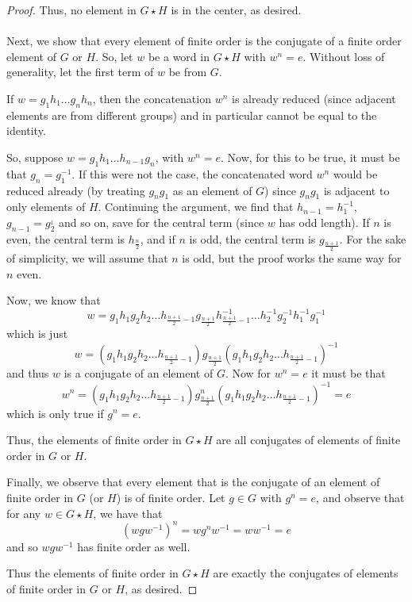 \documentclass[fontsize=11pt]{scrartcl} %
\numberwithin{equation}{section} %
\numberwithin{figure}{section} %
\numberwithin{table}{section} %
\begin{document}
\begin{proof}
    Thus, no element in $G\star H$ is in the center, as desired.
    \\
    \\
    Next, we show that every element of finite order is the conjugate of a
    finite order element of $G$ or $H$. So, let $w$ be a word in $G\star H$ with
    $w^n = e$. Without loss of generality, let the first term of $w$ be from
    $G$.

    If $w = g_1h_1\dots g_nh_n$, then the concatenation $w^n$ is already reduced
    (since adjacent elements are from different groups) and in particular cannot
    be equal to the identity.

    So, suppose $w = g_1h_1\dots h_{n-1}g_{n}$, with $w^n = e$. Now, for this to
    be true, it must be that $g_n=g_1^{-1}$. If this were not the case, the
    concatenated word $w^n$ would be reduced already (by treating $g_ng_1$ as an
    element of $G$) since $g_ng_1$ is adjacent to only elements of $H$.
    Continuing the argument, we find that $h_{n-1} = h_1^{-1}$,
    $g_{n-1}=g_2^{_1}$ and so on, save for the central term (since $w$ has odd
    length). If $n$ is even, the central term is $h_{\frac{n}{2}}$, and if $n$
    is odd, the central term is $g_{\frac{n+1}{2}}$. For the sake of simplicity,
    we will assume that $n$ is odd, but the proof works the same way for $n$
    even.

    Now, we know that
    \[
        w = g_1h_1g_2h_2\dots h_{\frac{n+1}{2}-1}
        g_{\frac{n+1}{2}}h_{\frac{n+1}{2}-1}^{-1}\dots h_2^{-1}g_2^{-1}h_1^{-1}g_1^{-1}
    \]
    which is just
    \[
        w= (g_1h_1g_2h_2\dots
        h_{\frac{n+1}{2}-1})g_{\frac{n+1}{2}}(g_1h_1g_2h_2\dots
        h_{\frac{n+1}{2}-1})^{-1}
    \]
    and thus $w$ is a conjugate of an element of $G$. Now for $w^n = e$ it must
    be that 
    \[
        w^n = 
        (g_1h_1g_2h_2\dots
        h_{\frac{n+1}{2}-1})g^n_{\frac{n+1}{2}}(g_1h_1g_2h_2\dots
        h_{\frac{n+1}{2}-1})^{-1} = e
    \]
    which is only true if $g^n = e$.

    Thus, the elements of finite order in $G\star H$ are all conjugates of
    elements of finite order in $G$ or $H$.

    Finally, we observe that every element that is the conjugate of an element
    of finite order in $G$ (or $H$) is of finite order. Let $g\in G$ with $g^n =
    e$, and observe that for any $w\in G\star H$, we have that
    \[
        (wgw^{-1})^n = wg^nw^{-1} = ww^{-1} = e
    \]
    and so $wgw^{-1}$ has finite order as well.

    Thus the elements of finite order in $G\star H$ are exactly the conjugates
    of elements of finite order in $G$ or $H$, as desired.
\end{proof}
\end{document}
